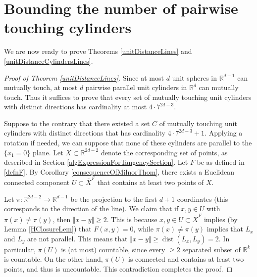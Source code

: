 \documentclass[letterpaper, reqno, 11pt]{article}
\numberwithin{equation}{section}
\newcommand{\RR}{\mathbb{R}}
\theoremstyle{remark}
\begin{document}
\section{Bounding the number of pairwise touching cylinders}
We are now ready to prove Theorems \ref{unitDistanceLines} and \ref{unitDistanceCylindersLines}.
\begin{proof}[Proof of Theorem \ref{unitDistanceLines}]
Since at most $d$ unit spheres in $\RR^{d-1}$ can mutually touch, at most $d$ pairwise parallel unit cylinders in $\RR^d$ can mutually touch. Thus it suffices to prove that every set of mutually touching unit cylinders with distinct directions has cardinality at most $4\cdot 7^{2d-3}$. 

Suppose to the contrary that there existed a set $C$ of  mutually touching unit cylinders with distinct directions that has cardinality $4\cdot 7^{2d-3}+1$. Applying a rotation if needed, we can suppose that none of these cylinders are parallel to the $\{x_1=0\}$ plane. Let $X\subset\RR^{2d-2}$ denote the corresponding set of points, as described in Section \ref{algExpressionForTangencySection}. Let $F$ be as defined in \eqref{defnF}. By Corollary \ref{consequenceOfMilnorThom}, there exists a Euclidean connected component $U\subset \bar X^F$ that contains at least two points of $X$.

Let $\pi\colon\RR^{2d-2}\to\RR^{d-1}$ be the projection to the first $d+1$ coordinates (this corresponds to the direction of the line). We claim that if $x,y\in U$ with $\pi(x)\neq\pi(y)$, then $\Vert x-y\Vert \geq 2$. This is because $x,y\in U \subset\overline X^F$ implies (by Lemma \ref{HClosureLem}) that $F(x,y) = 0$, while $\pi(x)\neq \pi(y)$ implies that $L_x$ and $L_y$ are not parallel. This means that $\Vert x-y\Vert \geq \operatorname{dist}(L_x, L_y) = 2$. In particular, $\pi(U)$ is (at most) countable, since every $\geq 2$ separated subset of $\RR^k$ is countable. On the other hand, $\pi(U)$ is connected and contains at least two points, and thus is uncountable. This contradiction completes the proof.
\end{proof}
\end{document}
